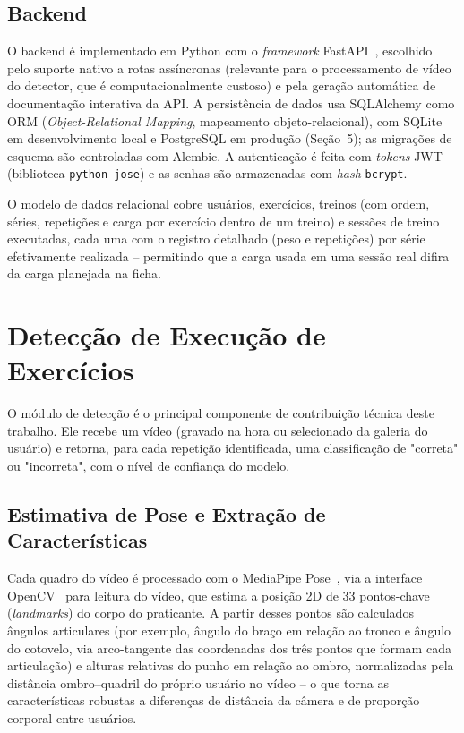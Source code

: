 \documentclass[12pt]{article}
\begin{document}
\subsection{Backend}

O backend é implementado em Python com o \textit{framework}
FastAPI~\cite{fastapi}, escolhido pelo suporte nativo a rotas assíncronas
(relevante para o processamento de vídeo do detector, que é
computacionalmente custoso) e pela geração automática de documentação
interativa da API. A persistência de dados usa SQLAlchemy como ORM (\textit{Object-Relational Mapping}, mapeamento
objeto-relacional), com
SQLite em desenvolvimento local e PostgreSQL em produção (Seção~5); as
migrações de esquema são controladas com Alembic. A autenticação é feita
com \textit{tokens} JWT (biblioteca \texttt{python-jose}) e as senhas são
armazenadas com \textit{hash} \texttt{bcrypt}.

O modelo de dados relacional cobre usuários, exercícios, treinos (com
ordem, séries, repetições e carga por exercício dentro de um treino) e
sessões de treino executadas, cada uma com o registro detalhado (peso e
repetições) por série efetivamente realizada -- permitindo que a carga
usada em uma sessão real difira da carga planejada na ficha.

\section{Detecção de Execução de Exercícios}

O módulo de detecção é o principal componente de contribuição técnica
deste trabalho. Ele recebe um vídeo (gravado na hora ou selecionado da
galeria do usuário) e retorna, para cada repetição identificada, uma
classificação de "correta" ou "incorreta", com o nível de confiança do
modelo.

\subsection{Estimativa de Pose e Extração de Características}

Cada quadro do vídeo é processado com o MediaPipe
Pose~\cite{lugaresi2019mediapipe}, via a interface OpenCV~\cite{bradski2000opencv}
para leitura do vídeo, que estima a posição 2D de 33 pontos-chave (\textit{landmarks})
do corpo do praticante. A partir desses pontos são calculados ângulos
articulares (por exemplo, ângulo do braço em relação ao tronco e ângulo do
cotovelo, via arco-tangente das coordenadas dos três pontos que formam
cada articulação) e alturas relativas do punho em relação ao ombro,
normalizadas pela distância ombro--quadril do próprio usuário no vídeo --
o que torna as características robustas a diferenças de distância da
câmera e de proporção corporal entre usuários.
\end{document}

